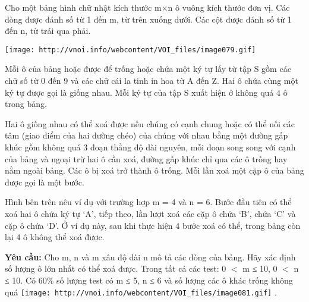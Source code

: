 Cho một bảng hình chữ nhật kích thước m×n ô vuông kích thước đơn vị. Các dòng được đánh số từ 1 đến m, từ trên xuống dưới. Các cột được đánh số từ 1 đến n, từ trái qua phải.


\texttt{[image: http://vnoi.info/webcontent/VOI\_files/image079.gif]}

Mỗi ô của bảng hoặc được để trống hoặc chứa một ký tự lấy từ tập S gồm các chữ số từ 0 đến 9 và các chữ cái la tinh in hoa từ A đến Z. Hai ô chứa cùng một ký tự được gọi là giống nhau. Mỗi ký tự của tập S xuất hiện ở không quá 4 ô trong bảng.

Hai ô giống nhau có thể xoá được nếu chúng có cạnh chung hoặc có thể nối các tâm (giao điểm của hai đường chéo) của chúng với nhau bằng một đường gấp khúc gồm không quá 3 đoạn thẳng độ dài nguyên, mỗi đoạn song song với cạnh của bảng và ngoại trừ hai ô cần xoá, đường gấp khúc chỉ qua các ô trống hay nằm ngoài bảng. Các ô bị xoá trở thành ô trống. Mỗi lần xoá một cặp ô của bảng được gọi là một bước.

Hình bên trên nêu ví dụ với trường hợp m = 4 và n = 6. Bước đầu tiên có thể xoá hai ô chứa ký tự ‘A’, tiếp theo, lần lượt xoá các cặp ô chứa ‘B’, chứa ‘C’ và cặp ô chứa ‘D’. Ở ví dụ này, sau khi thực hiện 4 bước xoá có thể, trong bảng còn lại 4 ô không thể xoá được.

\textbf{Yêu cầu: } Cho m, n và m xâu độ dài n mô tả các dòng của bảng. Hãy xác định số lượng ô lớn nhất có thể xoá được.
Trong tất cả các test: 0 $<$ m ≤ 10, 0 $<$ n ≤ 10. Có 60\% số lượng test có m ≤ 5, n ≤ 6 và số lượng các ô khác trống không quá 
\texttt{[image: http://vnoi.info/webcontent/VOI\_files/image081.gif]} .